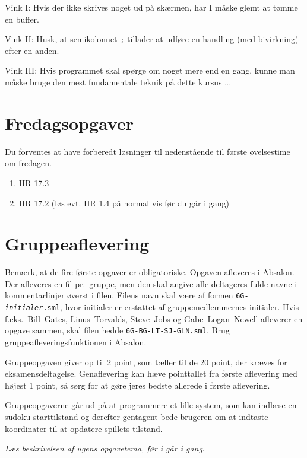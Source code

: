 \documentclass[a4paper]{article}
\begin{document}
\begin{enumerate}[{6}T1]
Vink I: Hvis der ikke skrives noget ud p{\aa} sk{\ae}rmen, har I m{\aa}ske glemt
at t{\o}mme en buffer.

Vink II: Husk, at semikolonnet \texttt{;} tillader at udf{\o}re en handling (med bivirkning)
efter en anden.

Vink III: Hvis programmet skal sp{\o}rge om noget mere end en gang, kunne man m{\aa}ske bruge den
mest fundamentale teknik p{\aa} dette kursus \ldots
\end{enumerate}

\section{Fredagsopgaver}

Du forventes at have forberedt l{\o}sninger til nedenst{\aa}ende til f{\o}rste {\o}velsestime om fredagen.

\begin{enumerate}[{6}F1]
\item HR 17.3
\item HR 17.2 (løs evt. HR 1.4 på normal vis før du går i gang)

\end{enumerate}


\section{Gruppeaflevering}
Bem{\ae}rk, at de fire f{\o}rste opgaver er obligatoriske.
Opgaven afleveres i Absalon.  Der afleveres en fil pr.\ gruppe, men
den skal angive alle deltageres fulde navne i kommentarlinjer øverst i
filen. Filens navn skal være af formen
\texttt{6G-\textit{initialer}.sml}, hvor initialer er erstattet af
gruppemedlemmernes initialer. Hvis f.eks.\ Bill~Gates, Linus~Torvalds,
Steve~Jobs og Gabe~Logan~Newell afleverer en opgave sammen, skal filen
hedde \texttt{6G-BG-LT-SJ-GLN.sml}. Brug gruppeafleveringsfunktionen i
Absalon.

Gruppeopgaven giver op til 2 point, som tæller til de 20 point, der
kræves for eksamensdeltagelse.  Genaflevering kan hæve pointtallet fra
første aflevering med højest 1 point, så sørg for at gøre jeres bedste
allerede i første aflevering.

Gruppeopgaverne g{\aa}r ud p{\aa} at programmere et lille system, som kan indl{\ae}se
en sudoku-starttilstand og derefter gentagent bede brugeren om at
indtaste koordinater til at opdatere spillets tilstand.

\emph{L{\ae}s beskrivelsen af ugens opgavetema, f{\o}r i g{\aa}r i gang}.
\end{document}
